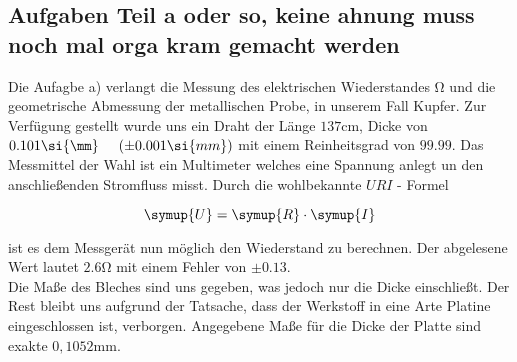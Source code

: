 \subsection{Aufgaben Teil a oder so, keine ahnung muss noch mal orga kram gemacht werden}
\label{sec:aufgabe_a}

Die Aufagbe a) verlangt die Messung des elektrischen Wiederstandes $\si{\ohm}$ und die geometrische Abmessung der metallischen Probe, in unserem Fall Kupfer.
Zur Verfügung gestellt wurde uns ein Draht der Länge $137\si{\cm}$, Dicke von $0.101 \si{\mm} \hspace{0.5cm} (\pm 0.001 \si{mm})$ mit einem Reinheitsgrad von $99.99$. 
Das Messmittel der Wahl ist ein Multimeter welches eine Spannung anlegt un den anschließenden Stromfluss misst.
Durch die wohlbekannte  $URI$ - Formel 

\begin{equation}
   \symup{U} = \symup{R} \cdot \symup{I}
\end{equation}

ist es dem  Messgerät nun möglich den Wiederstand zu berechnen.
Der abgelesene Wert lautet $2.6\si{\ohm}$ mit einem Fehler von $\pm 0.13$. \\ 

Die Maße des Bleches sind uns gegeben, was jedoch nur die Dicke einschließt. %
Der Rest bleibt uns aufgrund der Tatsache, dass der Werkstoff in eine Arte Platine eingeschlossen ist, verborgen.
Angegebene Maße für die Dicke der Platte sind exakte $0,1052\si{\mm}$.
